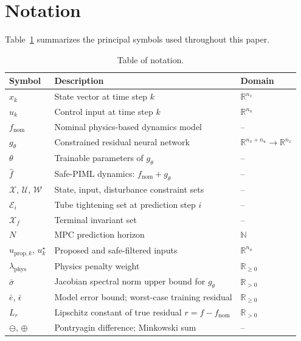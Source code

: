 \documentclass[12pt,a4paper]{article}
\begin{document}
\section{Notation}
\label{sec:notation}

Table~\ref{tab:notation} summarizes the principal symbols used
throughout this paper.

\begin{table}[t]
  \centering
  \caption{Table of notation.}
  \label{tab:notation}
  \begin{tabular*}{\textwidth}{@{\extracolsep{\fill}}lll}
    \toprule
    Symbol & Description & Domain \\
    \midrule
    $x_k$ & State vector at time step $k$ & $\mathbb{R}^{n_x}$ \\
    $u_k$ & Control input at time step $k$ & $\mathbb{R}^{n_u}$ \\
    $f_{\mathrm{nom}}$ & Nominal physics-based dynamics model & -- \\
    $g_\theta$ & Constrained residual neural network & $\mathbb{R}^{n_x+n_u} \to \mathbb{R}^{n_x}$ \\
    $\theta$ & Trainable parameters of $g_\theta$ & -- \\
    $\hat{f}$ & Safe-PIML dynamics: $f_{\mathrm{nom}} + g_\theta$ & -- \\
    $\mathcal{X}$, $\mathcal{U}$, $\mathcal{W}$ & State, input, disturbance constraint sets & -- \\
    $\mathcal{E}_i$ & Tube tightening set at prediction step $i$ & -- \\
    $\mathcal{X}_f$ & Terminal invariant set & -- \\
    $N$ & MPC prediction horizon & $\mathbb{N}$ \\
    $u_{\mathrm{prop},k}$, $u_k^\star$ & Proposed and safe-filtered inputs & $\mathbb{R}^{n_u}$ \\
    $\lambda_{\mathrm{phys}}$ & Physics penalty weight & $\mathbb{R}_{\geq 0}$ \\
    $\bar\sigma$ & Jacobian spectral norm upper bound for $g_\theta$ & $\mathbb{R}_{> 0}$ \\
    $\bar{e}$, $\bar\epsilon$ & Model error bound; worst-case training residual & $\mathbb{R}_{\geq 0}$ \\
    $L_r$ & Lipschitz constant of true residual $r = f - f_{\mathrm{nom}}$ & $\mathbb{R}_{> 0}$ \\
    $\ominus$, $\oplus$ & Pontryagin difference; Minkowski sum & -- \\
    \bottomrule
  \end{tabular*}
\end{table}
\end{document}
